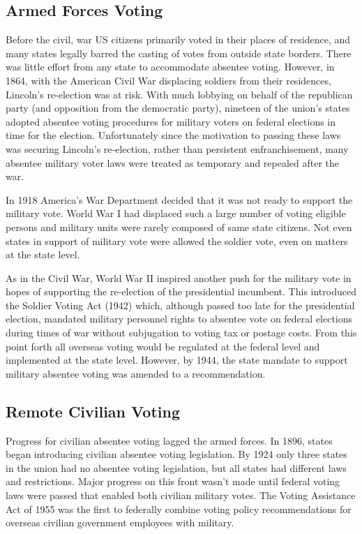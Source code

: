 \subsection{Armed Forces Voting}
Before the civil, war US citizens primarily voted in their places of residence,
and many states legally barred the casting of votes from outside state borders.
There was little effort from any state to accommodate absentee voting. However,
in 1864, with the American Civil War displacing soldiers from their residences,
Lincoln's re-election was at risk. With much lobbying on behalf of the
republican party (and opposition from the democratic party), nineteen of the
union's states adopted absentee voting procedures for military voters on
federal elections in time for the election. Unfortunately since the motivation
to passing these laws was securing Lincoln's re-election, rather than
persistent enfranchisement, many absentee military voter laws were treated as
temporary and repealed after the war.

In 1918 America's War Department decided that it was not ready to support the
military vote. World War I had displaced such a large number of voting eligible
persons and military units were rarely composed of same state citizens. Not
even states in support of military vote were allowed the soldier vote, even on
matters at the state level.

As in the Civil War, World War II inspired another push for the military vote
in hopes of supporting the re-election of the presidential incumbent. This
introduced the Soldier Voting Act (1942) which, although passed too late for
the presidential election, mandated military personnel rights to absentee vote
on federal elections during times of war without subjugation to voting tax or
postage costs. From this point forth all overseas voting would be regulated at
the federal level and implemented at the state level. However, by 1944, the
state mandate to support military absentee voting was amended to a
recommendation.

\subsection{Remote Civilian Voting}

Progress for civilian absentee voting lagged the armed forces. In 1896, states
began introducing civilian absentee voting legislation. By 1924 only three
states in the union had no absentee voting legislation, but all states had
different laws and restrictions. Major progress on this front wasn't made until
federal voting laws were passed that enabled both civilian military votes.
The Voting Assistance Act of 1955 was the first to federally
combine voting policy recommendations for overseas civilian government
employees with military.

